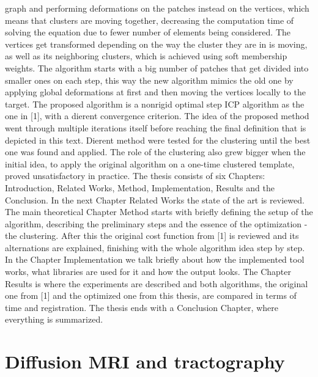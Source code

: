 \documentclass[../structure.tex]{subfiles}
\begin{document}
graph and performing deformations on the patches instead on the vertices,
which means that clusters are moving together, decreasing the computation
time of solving the equation due to fewer number of elements being
considered. The vertices get transformed depending on the way the cluster
they are in is moving, as well as its neighboring clusters, which is achieved
using soft membership weights. The algorithm starts with a big number of
patches that get divided into smaller ones on each step, this way the new
algorithm mimics the old one by applying global deformations at first and
then moving the vertices locally to the target. The proposed algorithm is
a nonrigid optimal step ICP algorithm as the one in [1], with a dierent
convergence criterion.
The idea of the proposed method went through multiple iterations itself
before reaching the final definition that is depicted in this text. Dierent
method were tested for the clustering until the best one was found and applied.
The role of the clustering also grew bigger when the initial idea, to
apply the original algorithm on a one-time clustered template, proved unsatisfactory
in practice.
The thesis consists of six Chapters: Introduction, Related Works, Method,
Implementation, Results and the Conclusion. In the next Chapter Related
Works the state of the art is reviewed. The main theoretical Chapter Method
starts with briefly defining the setup of the algorithm, describing the preliminary
steps and the essence of the optimization - the clustering. After this the
original cost function from [1] is reviewed and its alternations are explained,
finishing with the whole algorithm idea step by step. In the Chapter Implementation
we talk briefly about how the implemented tool works, what
libraries are used for it and how the output looks. The Chapter Results is
where the experiments are described and both algorithms, the original one
from [1] and the optimized one from this thesis, are compared in terms of
time and registration. The thesis ends with a Conclusion Chapter, where
everything is summarized.
	\section{Diffusion MRI and tractography}
	
\end{document}
